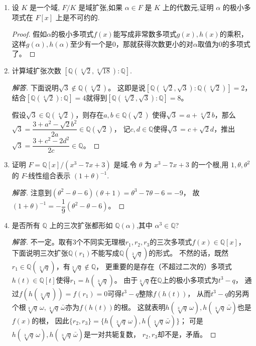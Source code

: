 \begin{enumerate}
    \item 设 $K$ 是一个域, $F/K$ 是域扩张,如果 $\alpha \in F$ 是 $K$ 上的代数元,证明 $\alpha$ 的极小多项式在 $F[x]$ 上是不可约的.
    \begin{proof}
        假如$\alpha$的极小多项式$f(x)$能写成非常数多项式$g(x),h(x)$的乘积，
        这样$g(\alpha),h(\alpha)$至少有一个是$0$，那就获得次数更小的对$\alpha$取值为$0$的多项式了。
    \end{proof}

    \item 计算域扩张次数 $[\mathbb{Q}(\sqrt[4]{2}, \sqrt[4]{18}): \mathbb{Q}]$.
    \begin{proof}[解答]
        下面说明$\sqrt{3}\notin\mathbb{Q}(\sqrt[4]{2})$。
        这即是说$[\mathbb{Q}(\sqrt[4]{2},\sqrt{3}):\mathbb{Q}(\sqrt[4]{2})]=2$，
        结合$[\mathbb{Q}(\sqrt[4]{2}):\mathbb{Q}]=4$就得到$[\mathbb{Q}(\sqrt[4]{2},\sqrt{3}):\mathbb{Q}]=8$。

        假设$\sqrt{3}\in\mathbb{Q}(\sqrt[4]{2})$，则存在$a,b\in\mathbb{Q}(\sqrt{2})$
        使得$\sqrt{3}=a+\sqrt[4]{2}b$，那么$\sqrt{3}=\dfrac{3+a^2-\sqrt{2}b^2}{2a}\in\mathbb{Q}(\sqrt{2})$，
        记$c,d\in\mathbb{Q}$使得$\sqrt{3}=c+\sqrt{2}d$，推出$\sqrt{3}=\dfrac{3+c^2-2d^2}{2c}\in\mathbb{Q}$。
    \end{proof}

    \item 证明 $F = \mathbb{Q}[x]/(x^3 - 7x + 3)$ 是域.令 $\theta$ 为 $x^3 - 7x + 3$ 的一个根,用 $1, \theta, \theta^2$ 的 $F$-线性组合表示 $(1 + \theta)^{-1}$.
    \begin{proof}[解答]
        注意到$(\theta^2-\theta-6)(\theta+1)=\theta^3-7\theta-6=-9$，
        故$(1+\theta)^{-1}=-\dfrac{1}{9}(\theta^2-\theta-6)$。
    \end{proof}

    \item 是否所有 $\mathbb{Q}$ 上的三次扩张都形如 $\mathbb{Q}(\alpha)$,其中 $\alpha^3 \in \mathbb{Q}$?
    \begin{proof}[解答]
        不一定。取有$3$个不同实无理根$r_1,r_2,r_3$的三次多项式$f(x)\in\mathbb{Q}[x]$，
        下面说明三次扩张$\mathbb{Q}(r_1)$不能写成$\mathbb{Q}(\sqrt[3]{q})$的形式。
        不然的话，既然$r_1\in\mathbb{Q}(\sqrt[3]{q})$，有$\sqrt[3]{q}\notin\mathbb{Q}$，
        更重要的是存在（不超过二次的）多项式$h(t)\in\mathbb{Q}[t]$使得$r_1=h(\sqrt[3]{q})$。
        由于$\sqrt[3]{q}$在$\mathbb{Q}$上的极小多项式为$t^3-q$，
        通过$f(h(\sqrt[3]{q}))=f(r_1)=0$可得$t^3-q$整除$f(h(t))$，
        从而$t^3-q$的另两个根$\sqrt[3]{q}\,\omega,\sqrt[3]{q}\,\bar{\omega}$亦为$f(h(t))$的根。
        这就表明$h(\sqrt[3]{q}\,\omega),h(\sqrt[3]{q}\,\bar{\omega})$也是$f(x)$的根，
        因此$\{r_2,r_3\}=\{h(\sqrt[3]{q}\,\omega),h(\sqrt[3]{q}\,\bar{\omega})\}$；
        可是$h(\sqrt[3]{q}\,\omega),h(\sqrt[3]{q}\,\bar{\omega})$是一对共轭复数，
        $r_2,r_3$却不是，矛盾。


\end{proof}
\end{enumerate}
